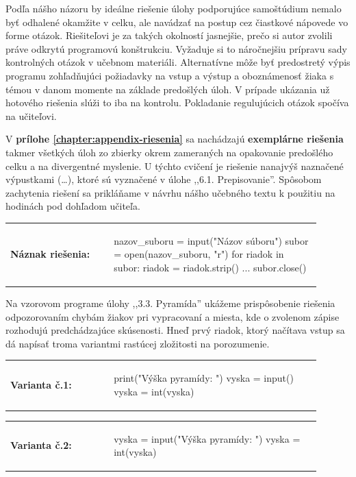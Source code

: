 Podľa nášho názoru by ideálne riešenie úlohy podporujúce samoštúdium nemalo byť odhalené okamžite v celku, ale navádzať na postup cez čiastkové nápovede vo forme otázok. Riešiteľovi je za takých okolností jasnejšie, prečo si autor zvolili práve odkrytú programovú konštrukciu. Vyžaduje si to náročnejšiu prípravu sady kontrolných otázok v učebnom materiáli. Alternatívne môže byť predostretý výpis programu zohľadňujúci požiadavky na vstup a výstup a oboznámenosť žiaka s témou v danom momente na základe predošlých úloh. V prípade ukázania už hotového riešenia slúži to iba na kontrolu. Pokladanie regulujúcich otázok spočíva na učiteľovi.

V \textbf{prílohe \ref{chapter:appendix-riesenia}} sa nachádzajú \textbf{exemplárne riešenia} takmer všetkých úloh zo zbierky okrem zameraných na opakovanie predošlého celku a na divergentné myslenie. U týchto cvičení je riešenie nanajvýš naznačené výpustkami (\dots), ktoré sú vyznačené v úlohe ,,6.1. Prepisovanie''. Spôsobom zachytenia riešení sa prikláňame v návrhu nášho učebného textu k použitiu na hodinách pod dohľadom učiteľa.

\begin{tabular}{@{}p{0.3\linewidth}p{0.6\linewidth}}
\textbf{\small Náznak riešenia:} &
\vspace{-1em}
\begin{solution}
nazov_suboru = input("Názov súboru")
subor = open(nazov_suboru, "r")
for riadok in subor:
   riadok = riadok.strip()
   ...
subor.close()
\end{solution}
\end{tabular}

Na vzorovom programe úlohy ,,3.3. Pyramída'' ukážeme prispôsobenie riešenia odpozorovaním chybám žiakov pri vypracovaní a miesta, kde o zvolenom zápise rozhodujú predchádzajúce skúsenosti. Hneď prvý riadok, ktorý načítava vstup sa dá napísať troma variantmi rastúcej zložitosti na porozumenie.

\begin{tabular}{@{}p{0.3\linewidth}p{0.6\linewidth}}
\textbf{\small Varianta č.1:} &
\vspace{-1em}
\begin{solution}
print("Výška pyramídy: ")
vyska = input()
vyska = int(vyska)
\end{solution}
\end{tabular}

\vspace{-2em}
\begin{tabular}{@{}p{0.3\linewidth}p{0.6\linewidth}}
\textbf{\small Varianta č.2:} &
\vspace{-1em}
\begin{solution}
vyska = input("Výška pyramídy: ")
vyska = int(vyska)
\end{solution}
\end{tabular}

